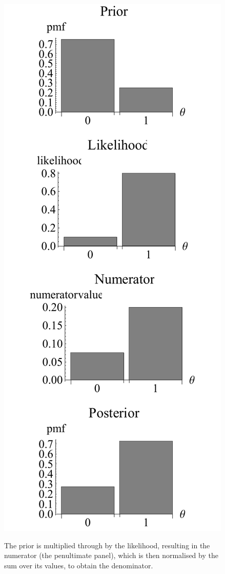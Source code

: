 \documentclass[11pt,fullpage]{book}
\begin{document}
\begin{figure}
\centering
\scalebox{0.8} 
{\includegraphics{Denominator_discreteExample.pdf}}\caption{The prior is multiplied through by the likelihood, resulting in the numerator (the penultimate panel), which is then normalised by the sum over its values, to obtain the denominator.}\label{fig:Denominator_discreteExample}
\end{figure}
\end{document}
